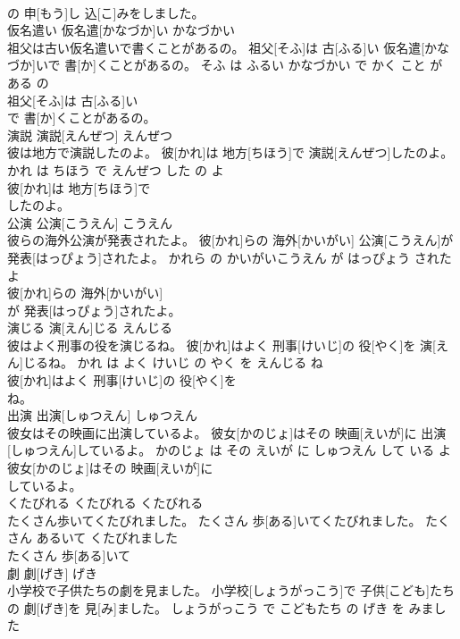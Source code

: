 \documentclass[8pt]{extreport}
\begin{document}
\begin{CJK}{UTF8}{min}
\\	の 申[もう]し 込[こ]みをしました。			
\\	仮名遣い	仮名遣[かなづか]い	かなづかい	
\\	祖父は古い仮名遣いで書くことがあるの。	祖父[そふ]は 古[ふる]い 仮名遣[かなづか]いで 書[か]くことがあるの。	そふ は ふるい かなづかい で かく こと が ある の	
\\	祖父[そふ]は 古[ふる]い
\\	で 書[か]くことがあるの。			
\\	演説	演説[えんぜつ]	えんぜつ	
\\	彼は地方で演説したのよ。	彼[かれ]は 地方[ちほう]で 演説[えんぜつ]したのよ。	かれ は ちほう で えんぜつ した の よ	
\\	彼[かれ]は 地方[ちほう]で
\\	したのよ。			
\\	公演	公演[こうえん]	こうえん	
\\	彼らの海外公演が発表されたよ。	彼[かれ]らの 海外[かいがい] 公演[こうえん]が 発表[はっぴょう]されたよ。	かれら の かいがいこうえん が はっぴょう された よ	
\\	彼[かれ]らの 海外[かいがい]
\\	が 発表[はっぴょう]されたよ。			
\\	演じる	演[えん]じる	えんじる	
\\	彼はよく刑事の役を演じるね。	彼[かれ]はよく 刑事[けいじ]の 役[やく]を 演[えん]じるね。	かれ は よく けいじ の やく を えんじる ね	
\\	彼[かれ]はよく 刑事[けいじ]の 役[やく]を
\\	ね。			
\\	出演	出演[しゅつえん]	しゅつえん	
\\	彼女はその映画に出演しているよ。	彼女[かのじょ]はその 映画[えいが]に 出演[しゅつえん]しているよ。	かのじょ は その えいが に しゅつえん して いる よ	
\\	彼女[かのじょ]はその 映画[えいが]に
\\	しているよ。			
\\	くたびれる	くたびれる	くたびれる	
\\	たくさん歩いてくたびれました。	たくさん 歩[ある]いてくたびれました。	たくさん あるいて くたびれました	
\\	たくさん 歩[ある]いて
\\	劇	劇[げき]	げき	
\\	小学校で子供たちの劇を見ました。	小学校[しょうがっこう]で 子供[こども]たちの 劇[げき]を 見[み]ました。	しょうがっこう で こどもたち の げき を みました	

\end{CJK}
\end{document}
